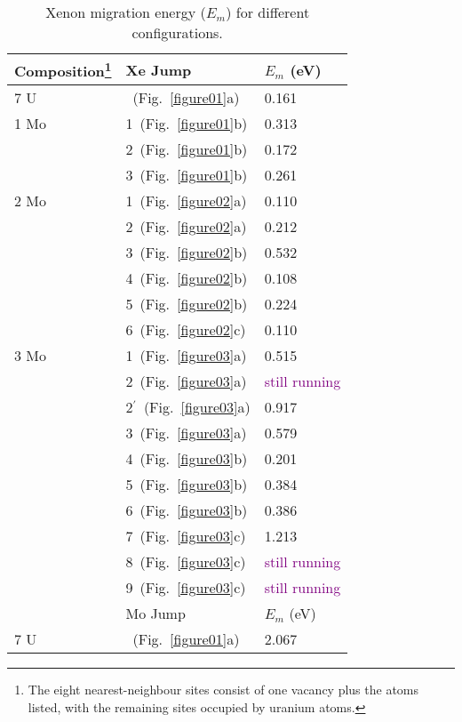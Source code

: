 \begin{table}
    \caption{Xenon migration energy ($E_m$) for different configurations.}
    \label{tab_acten}
    \centering
    \begin{minipage}{19.45em}
    \begin{tabular}{ l l l }
      \toprule
        Composition\footnote{The eight nearest-neighbour sites consist of
            one vacancy plus the atoms listed, with the remaining sites
            occupied by uranium atoms.}
        & Xe Jump
        & $E_m$ (eV) \\
      \midrule
        7 U & ~(Fig.~\ref{figure01}a) & 0.161  \\
        1 Mo & 1~(Fig.~\ref{figure01}b) & 0.313 \\ 
             & 2~(Fig.~\ref{figure01}b) & 0.172 \\
             & 3~(Fig.~\ref{figure01}b) & 0.261 \\
        2 Mo & 1~(Fig.~\ref{figure02}a) & 0.110 \\
             & 2~(Fig.~\ref{figure02}a) & 0.212 \\
             & 3~(Fig.~\ref{figure02}b) & 0.532 \\
             & 4~(Fig.~\ref{figure02}b) & 0.108 \\
             & 5~(Fig.~\ref{figure02}b) & 0.224 \\
             & 6~(Fig.~\ref{figure02}c) & 0.110 \\
 	3 Mo & 1~(Fig.~\ref{figure03}a) & 0.515 \\
	     & 2~(Fig.~\ref{figure03}a) & \tiny{\textcolor{purple}{still running}}		\\
	     & 2$^\prime$~(Fig.~\ref{figure03}a) & 0.917	\\
	     & 3~(Fig.~\ref{figure03}a) & 0.579	\\
	     & 4~(Fig.~\ref{figure03}b) & 0.201	\\
	     & 5~(Fig.~\ref{figure03}b) & 0.384	\\
	     & 6~(Fig.~\ref{figure03}b) & 0.386	\\
	     & 7~(Fig.~\ref{figure03}c) & 1.213	\\
	     & 8~(Fig.~\ref{figure03}c) & \tiny{\textcolor{purple}{still running}}	\\
	     & 9~(Fig.~\ref{figure03}c) & \tiny{\textcolor{purple}{still running}}	\\
      \midrule
             & Mo Jump & $E_m$ (eV) \\%
      \midrule
        7 U & ~(Fig.~\ref{figure01}a)  & 2.067 \\
      \bottomrule
    \end{tabular}
    \end{minipage}
\end{table}



